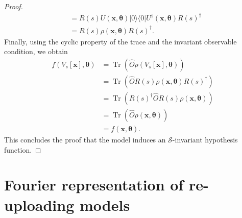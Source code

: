 \documentclass[%
 reprint,
 amsmath,amssymb,
 aps,
 pra,
]{revtex4-2}
\theoremstyle{definition}
\begin{document}
\begin{proof}
\begin{equation}
\begin{aligned}
&= R(s) U(\bm{x}, \bm{\theta}) |0\rangle\langle0| U^\dagger(\bm{x}, \bm{\theta}) R(s)^\dagger \\
&= R(s) \rho(\bm{x}, \bm{\theta}) R(s)^\dagger.
\end{aligned}
\end{equation}
Finally, using the cyclic property of the trace and the invariant observable condition, we obtain
\begin{equation}
\begin{aligned}
f(V_s[\bm{x}], \bm{\theta})
&= \operatorname{Tr}\left(\hat{O}\rho(V_s[\bm{x}], \bm{\theta})\right) \\
&= \operatorname{Tr}\left(\hat{O}R(s)\rho(\bm{x}, \bm{\theta})R(s)^\dagger\right) \\
&= \operatorname{Tr}\left(R(s)^\dagger \hat{O} R(s)\rho(\bm{x}, \bm{\theta})\right) \\
&= \operatorname{Tr}\left(\hat{O}\rho(\bm{x}, \bm{\theta})\right) \\
&= f(\bm{x}, \bm{\theta}).
\end{aligned}
\end{equation}
This concludes the proof that the model induces an \(\mathcal{S}\)-invariant hypothesis function.
\end{proof}

\section{Fourier representation of re-uploading models}
\end{document}
